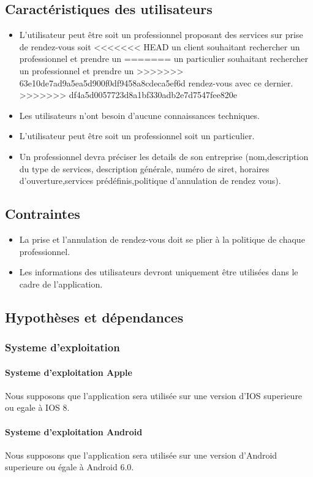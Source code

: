 \documentclass{article}
\begin{document}
\begin{itemize}
\subsection{Caractéristiques des utilisateurs}
\begin{itemize}
\item L'utilisateur peut être soit un professionnel proposant des
  services sur prise de rendez-vous soit
<<<<<<< HEAD
  un client souhaitant rechercher un professionnel et prendre un
=======
  un particulier souhaitant rechercher un professionnel et prendre un
>>>>>>> 63e10de7ad9a5ea5d900f0df9458a8cdeca5ef6d
  rendez-vous avec ce dernier.
>>>>>>> df4a5d0057723d8a1bf330adb2e7d7547fee820e
\item Les utilisateurs n'ont besoin d'aucune connaissances techniques.
\item L'utilisateur peut être soit un professionnel soit un particulier.
\item Un professionnel devra préciser les details de son entreprise (nom,description du
	type de services, description générale, numéro de siret, horaires d'ouverture,services prédéfinis,politique d'annulation de rendez vous).
\end{itemize}
\subsection{Contraintes}
\begin{itemize}
\item La prise et l'annulation de rendez-vous doit se plier à la
  politique de chaque professionnel.
\item Les informations des utilisateurs devront uniquement être
  utilisées dans le cadre de l'application.
\end{itemize}
\subsection{Hypothèses et dépendances}
\subsubsection{Systeme d'exploitation}
\paragraph{Systeme d'exploitation Apple}
Nous supposons que l'application sera utilisée sur une version d'IOS superieure ou egale à IOS 8.
\paragraph{Systeme d'exploitation Android}
Nous supposons que l'application sera utilisée sur une version d'Android superieure ou égale à Android 6.0.

\end{itemize}
\end{document}
